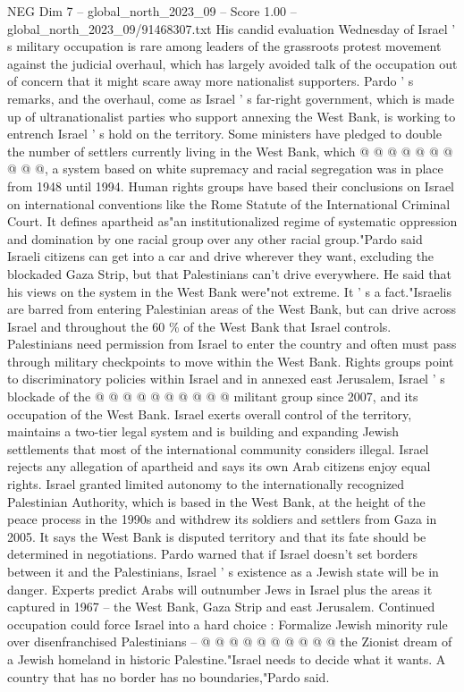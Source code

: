 \begin{textsample}{NEG Dim 7 – global\_north\_2023\_09 – Score 1.00 – global\_north\_2023\_09/91468307.txt}
His candid evaluation Wednesday of Israel ' s military occupation is rare among leaders of the grassroots protest movement against the judicial overhaul, which has largely avoided talk of the occupation out of concern that it might scare away more nationalist supporters.
Pardo ' s remarks, and the overhaul, come as Israel ' s far-right government, which is made up of ultranationalist parties who support annexing the West Bank, is working to entrench Israel ' s hold on the territory.
Some ministers have pledged to double the number of settlers currently living in the West Bank, which @ @ @ @ @ @ @ @ @ @, a system based on white supremacy and racial segregation was in place from 1948 until 1994.
Human rights groups have based their conclusions on Israel on international conventions like the Rome Statute of the International Criminal Court.
It defines apartheid as"an institutionalized regime of systematic oppression and domination by one racial group over any other racial group."Pardo said Israeli citizens can get into a car and drive wherever they want, excluding the blockaded Gaza Strip, but that Palestinians can't drive everywhere.
He said that his views on the system in the West Bank were"not extreme.
It ' s a fact."Israelis are barred from entering Palestinian areas of the West Bank, but can drive across Israel and throughout the 60 \% of the West Bank that Israel controls.
Palestinians need permission from Israel to enter the country and often must pass through military checkpoints to move within the West Bank.
Rights groups point to discriminatory policies within Israel and in annexed east Jerusalem, Israel ' s blockade of the @ @ @ @ @ @ @ @ @ @ militant group since 2007, and its occupation of the West Bank.
Israel exerts overall control of the territory, maintains a two-tier legal system and is building and expanding Jewish settlements that most of the international community considers illegal.
Israel rejects any allegation of apartheid and says its own Arab citizens enjoy equal rights.
Israel granted limited autonomy to the internationally recognized Palestinian Authority, which is based in the West Bank, at the height of the peace process in the 1990s and withdrew its soldiers and settlers from Gaza in 2005.
It says the West Bank is disputed territory and that its fate should be determined in negotiations.
Pardo warned that if Israel doesn't set borders between it and the Palestinians, Israel ' s existence as a Jewish state will be in danger.
Experts predict Arabs will outnumber Jews in Israel plus the areas it captured in 1967 -- the West Bank, Gaza Strip and east Jerusalem.
Continued occupation could force Israel into a hard choice : Formalize Jewish minority rule over disenfranchised Palestinians -- @ @ @ @ @ @ @ @ @ @ the Zionist dream of a Jewish homeland in historic Palestine."Israel needs to decide what it wants.
A country that has no border has no boundaries,"Pardo said.

\end{textsample}
